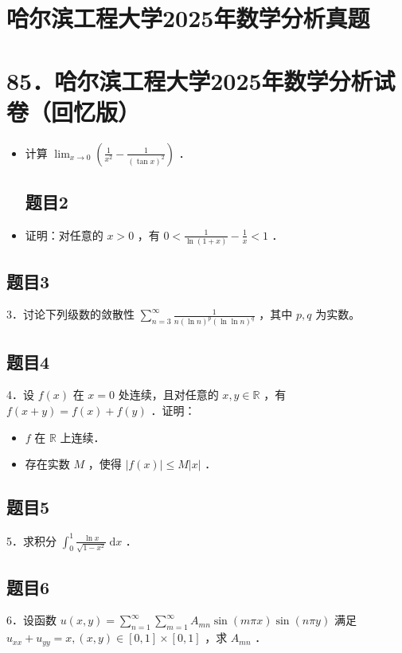\documentclass{article}
\begin{document}
\section*{哈尔滨工程大学2025年数学分析真题}
\section*{85．哈尔滨工程大学2025年数学分析试卷（回忆版）}
\begin{itemize}

\subsection{题目1}
  \item[1．] 计算 \(\lim _{x \rightarrow 0}\left(\frac{1}{x^{2}}-\frac{1}{(\tan x)^{2}}\right)\) ．

\subsection{题目2}
  \item[2．] 证明：对任意的 \(x>0\) ，有 \(0<\frac{1}{\ln (1+x)}-\frac{1}{x}<1\) ．
\end{itemize}

\subsection{题目3}
3．讨论下列级数的敛散性 \(\sum_{n=3}^{\infty} \frac{1}{n(\ln n)^{p}(\ln \ln n)^{q}}\) ，其中 \(p, q\) 为实数。

\subsection{题目4}
4．设 \(f(x)\) 在 \(x=0\) 处连续，且对任意的 \(x, y \in \mathbb{R}\) ，有 \(f(x+y)=f(x)+f(y)\) ．证明：

\begin{itemize}
  \item[（1）] \(f\) 在 \(\mathbb{R}\) 上连续．
  \item[（2）] 存在实数 \(M\) ，使得 \(|f(x)| \leq M|x|\) ．
\end{itemize}

\subsection{题目5}
5．求积分 \(\int_{0}^{1} \frac{\ln x}{\sqrt{1-x^{2}}} \mathrm{~d} x\) ．

\subsection{题目6}
6．设函数 \(u(x, y)=\sum_{n=1}^{\infty} \sum_{m=1}^{\infty} A_{m n} \sin (m \pi x) \sin (n \pi y)\) 满足 \(u_{x x}+u_{y y}=x,(x, y) \in[0,1] \times[0,1]\) ，求 \(A_{m n}\) ．
\end{document}
